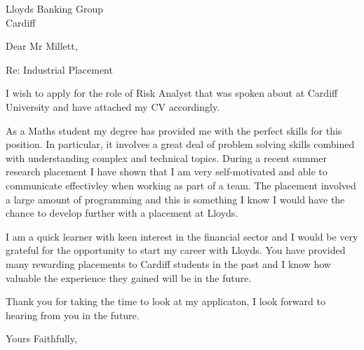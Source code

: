\documentclass[12pt]{letter}
\begin{document}
\begin{letter}
{Lloyds Banking Group \\ Cardiff}
\opening{Dear Mr Millett,}

Re: Industrial Placement

I wish to apply for the role of Risk Analyst that was spoken about at Cardiff University and have attached my CV accordingly.

As a Maths student my degree has provided me with the perfect skills for this position.
In particular, it involves a great deal of problem solving skills combined with understanding complex and technical topics.
During a recent summer research placement I have shown that I am very self-motivated and able to communicate effectivley when working as part of a team.
The placement involved a large amount of programming and this is something I know I would have the chance to develop further with a placement at Lloyds.

I am a quick learner with keen interest in the financial sector and I would be very grateful for the opportunity to start my career with Lloyds.
You have provided many rewarding placements to Cardiff students in the past and I know how valuable the experience they gained will be in the future.


Thank you for taking the time to look at my applicaton, I look forward to hearing from you in the future.

\closing{Yours Faithfully,}


\end{letter}
\end{document}
